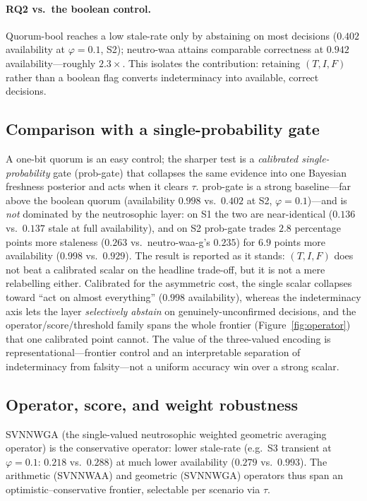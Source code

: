 \documentclass[fleqn,10pt]{wlscirep}
\begin{document}
\paragraph{RQ2 vs.\ the boolean control.} Quorum-bool reaches a low stale-rate only by abstaining on
most decisions ($0.402$ availability at $\varphi=0.1$, S2); neutro-waa attains comparable correctness
at $0.942$ availability---roughly $2.3\times$. This isolates the contribution: retaining $(T,I,F)$
rather than a boolean flag converts indeterminacy into available, correct decisions.

\subsection{Comparison with a single-probability gate}
A one-bit
quorum is an easy control; the sharper test is a \emph{calibrated single-probability} gate (prob-gate)
that collapses the same evidence into one Bayesian freshness posterior and acts when it clears $\tau$.
prob-gate is a strong baseline---far above the boolean quorum (availability $0.998$ vs.\ $0.402$ at S2,
$\varphi=0.1$)---and is \emph{not} dominated by the neutrosophic layer: on S1 the two are near-identical
($0.136$ vs.\ $0.137$ stale at full availability), and on S2 prob-gate trades $2.8$ percentage points
more staleness ($0.263$ vs.\ neutro-waa-g's $0.235$) for $6.9$ points more availability ($0.998$ vs.\
$0.929$). The result is reported as it stands: $(T,I,F)$ does not beat a
calibrated scalar on the headline trade-off, but it is not a mere relabelling either. Calibrated for the
asymmetric cost, the single scalar collapses toward ``act on almost everything'' ($0.998$ availability),
whereas the indeterminacy axis lets the layer \emph{selectively abstain} on genuinely-unconfirmed
decisions, and the operator/score/threshold family spans the whole frontier
(Figure~\ref{fig:operator}) that one calibrated point cannot. The value of the three-valued encoding is
representational---frontier control and an interpretable separation of indeterminacy from falsity---not a
uniform accuracy win over a strong scalar.

\subsection{Operator, score, and weight robustness}
SVNNWGA (the single-valued neutrosophic weighted geometric averaging
operator) is the conservative operator: lower stale-rate (e.g.\ S3 transient at $\varphi=0.1$: $0.218$
vs.\ $0.288$) at much lower availability ($0.279$ vs.\ $0.993$). The arithmetic (SVNNWAA) and geometric (SVNNWGA) operators
thus span an optimistic--conservative frontier, selectable per scenario via $\tau$.
\end{document}
